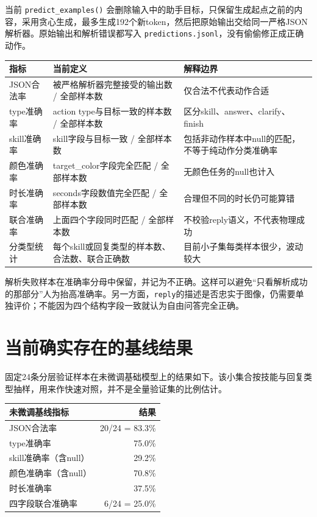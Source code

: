 当前 \texttt{predict\_examples()} 会删除输入中的助手目标，只保留生成起点之前的内容，采用贪心生成，最多生成192个新token，然后把原始输出交给同一严格JSON解析器。原始输出和解析错误都写入 \texttt{predictions.jsonl}，没有偷偷修正成正确动作。

\begin{longtable}{P{33mm}P{58mm}P{60mm}}
\toprule
指标 & 当前定义 & 解释边界\\
\midrule
\endhead
JSON合法率 & 被严格解析器完整接受的输出数 / 全部样本数 & 仅合法不代表动作合适\\
type准确率 & action type与目标一致的样本数 / 全部样本数 & 区分skill、answer、clarify、finish\\
skill准确率 & skill字段与目标一致 / 全部样本数 & 包括非动作样本中null的匹配，不等于纯动作分类准确率\\
颜色准确率 & target\_color字段完全匹配 / 全部样本数 & 无颜色任务的null也计入\\
时长准确率 & seconds字段数值完全匹配 / 全部样本数 & 合理但不同的时长仍可能算错\\
联合准确率 & 上面四个字段同时匹配 / 全部样本数 & 不校验reply语义，不代表物理成功\\
分类型统计 & 每个skill或回复类型的样本数、合法数、联合正确数 & 目前小子集每类样本很少，波动较大\\
\bottomrule
\end{longtable}

解析失败样本在准确率分母中保留，并记为不正确。这样可以避免“只看解析成功的那部分”人为抬高准确率。另一方面，\texttt{reply}的描述是否忠实于图像，仍需要单独评价；不能因为四个结构字段一致就认为自由问答完全正确。

\section{当前确实存在的基线结果}
固定24条分层验证样本在未微调基础模型上的结果如下。该小集合按技能与回复类型抽样，用来作快速对照，并不是全量验证集的比例估计。

\begin{center}
\begin{tabular}{lr}
\toprule
未微调基线指标 & 结果\\
\midrule
JSON合法率 & 20/24 = 83.3\%\\
type准确率 & 75.0\%\\
skill准确率（含null） & 29.2\%\\
颜色准确率（含null） & 70.8\%\\
时长准确率 & 37.5\%\\
四字段联合准确率 & 6/24 = 25.0\%\\
\bottomrule
\end{tabular}
\end{center}

